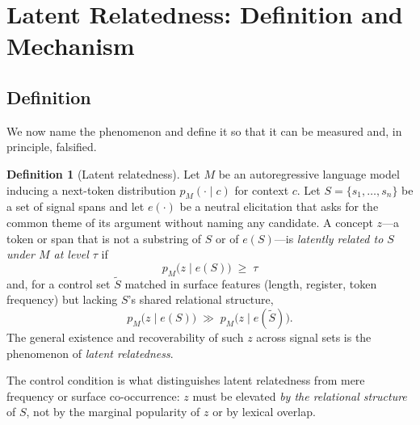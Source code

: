 \documentclass[conference]{IEEEtran}
\theoremstyle{definition}
\newtheorem{definition}{Definition}
\newcommand{\prob}{p}
\newcommand{\model}{M}
\newcommand{\sigset}{S}
\begin{document}
\section{Latent Relatedness: Definition and Mechanism}
\label{sec:latent}

\subsection{Definition}
We now name the phenomenon and define it so that it can be measured and, in principle, falsified.

\begin{definition}[Latent relatedness]
\label{def:lr}
Let $\model$ be an autoregressive language model inducing a next-token distribution $\prob_\model(\cdot \mid c)$ for context $c$. Let $\sigset = \{s_1,\dots,s_n\}$ be a set of signal spans and let $e(\cdot)$ be a neutral elicitation that asks for the common theme of its argument without naming any candidate. A concept $z$---a token or span that is not a substring of $\sigset$ or of $e(\sigset)$---is \emph{latently related to $\sigset$ under $\model$ at level $\tau$} if
\begin{equation}
\prob_\model\!\big(z \mid e(\sigset)\big) \;\ge\; \tau
\end{equation}
and, for a control set $\tilde{\sigset}$ matched in surface features (length, register, token frequency) but lacking $\sigset$'s shared relational structure,
\begin{equation}
\prob_\model\!\big(z \mid e(\sigset)\big) \;\gg\; \prob_\model\!\big(z \mid e(\tilde{\sigset})\big).
\end{equation}
The general existence and recoverability of such $z$ across signal sets is the phenomenon of \emph{latent relatedness}.
\end{definition}

The control condition is what distinguishes latent relatedness from mere frequency or surface co-occurrence: $z$ must be elevated \emph{by the relational structure} of $\sigset$, not by the marginal popularity of $z$ or by lexical overlap.
\end{document}

